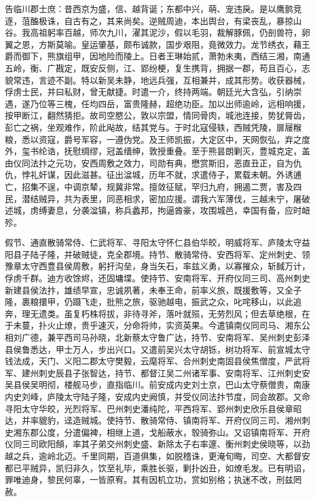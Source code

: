 \documentclass[]{article}
\begin{document}
告临川郡士庶：昔西京为盛，信、越背诞；东都中兴，萌、宠违戾。是以鹰鹯竞逐，菹醢极诛，自古有之，其来尚矣。逆贼周迪，本出舆台，有梁丧乱，暴掠山谷。我高祖躬率百越，师次九川，濯其泥沙，假以毛羽，裁解豚佩，仍剖兽符，卵翼之恩，方斯莫喻。皇运肇基，颇布诚款，国步艰阻，竟微效力。龙节绣衣，藉王爵而御下，熊旗组甲，因地险而陵上。日者王琳始贰，萧勃未夷，西结三湘，南通五岭，衡、广戡定，既安反侧，江、郢纷梗，复生携背，拥据一郡，苟且百心，志貌常违，言迹不副。特以新吴未静，地远兵强，互相兼并，成其形势。收获器械，俘虏士民，并曰私财，曾无献捷。时遣一介，终持两端。朝廷光大含弘，引纳崇遇，遂乃位等三槐，任均四岳，富贵隆赫，超绝功臣。加以出师逾岭，远相响援，按甲断江，翻然猜拒。故司空愍公，敦以宗盟，情同骨肉，城池连接，势犹脣齿，彭亡之祸，坐观难作，阶此飐故，结其党与。于时北寇侵轶，西贼凭陵，扉屦糇粮，悉以资寇，爵号军容，一遵伪党。及王师凯振，大定区中，天网恢弘，弃之度外，玺书纶诰，抚慰绸缪，冠盖缙绅，敦授重叠。至于熊昙朗剿灭，豊城克定，盖由仪同法抃之元功，安西周敷之效力，司勋有典，懋赏斯旧，恶直丑正，自为仇仇，悖礼奸谋，因此滋甚。征出湓城，历年不就，求遣侍子，累载未朝。外诱逋亡，招集不逞，中调京辇，规冀非常。擅敛征赋，罕归九府，拥遏二贾，害及四民，潜结贼异，共为表里，同恶相求，密加应援。谓我六军薄伐，三越未宁，屠破述城，虏缚妻息，分袭湓镇，称兵蠡邦，拘逼酋豪，攻围城邑，幸国有备，应时衄殄。

假节、通直散骑常侍、仁武将军、寻阳太守怀仁县伯华皎，明威将军、庐陵太守益阳县子陆子隆，并破贼徒，克全郡境。持节、散骑常侍、安西将军、定州刺史、领豫章太守西豊县侯周敷，躬扞沟垒，身当矢石，率兹义勇，以寡摧众，斩馘万计，俘虏千群。迪方收馀烬，还固墉堞。使持节、安南将军、开府仪同三司、高州刺史新建县侯法抃，雄绩早宣，忠诚夙著，未奉王命，前率义旅，既援敷等，又全子隆，裹粮擐甲，仍蹑飞走，批熊之旅，驱驰越电，振武之众，叱咤移山，以此追奔，理无遗类。虽复朽株将拔，非待寻斧，落叶就殒，无劳烈风；但去草绝根，在于未蔓，扑火止燎，贵乎速灭，分命将帅，实资英果。今遣镇南仪同司马、湘东公相刘广德，兼平西司马孙晓，北新蔡太守鲁广达，持节、安南将军、吴州刺史彭泽县侯鲁悉达，甲士万人，步出兴口。又遣前吴兴太守胡铄，树功将军、前宣城太守钱法成，天门、义阳二郡太守樊毅，云麾将军、合州刺史南固县侯焦僧度，严武将军、建州刺史辰县子张智达，持节、都督江吴二州诸军事、安南将军、江州刺史安吴县侯吴明彻，楼舰马步，直指临川。前安成内史刘士京，巴山太守蔡僧贵，南康内史刘峰，庐陵太守陆子隆，安成内史阙慎，并受仪同法抃节度，同会故郡。又命寻阳太守华皎，光烈将军、巴州刺史潘纯陀，平西将军、郢州刺史欣乐县侯章昭达，并率貔豹，迳造贼城。使持节、散骑常侍、镇南将军、开府仪同三司、湘州刺史湘东郡公度，分遣偏裨，相继上道，戈船蔽水，彀骑弥山。又诏镇南将军、开府仪同三司欧阳頠，率其子弟交州刺史盛、新除太子右率邃、衡州刺史侯晓等，以劲越之兵，逾岭北迈。千里同期，百道俱集，如脱稽诛，更淹旬晦，司空、大都督安都已平贼异，凯归非久，饮至礼毕，乘胜长驱，剿扑凶丑，如燎毛发。已有明诏，罪唯迪身，黎民何辜，一皆原宥。其有因机立功，赏如别格；执迷不改，刑兹罔赦。
\end{document}
